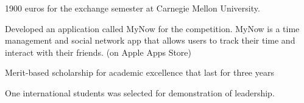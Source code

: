 \documentclass[]{deedy-resume-openfont}
\begin{document}
\begin{minipage}[t]{0.66\textwidth}
\sectionsep
{}
\begin{verytightemize}
\item 1900 euros for the exchange semester at Carnegie Mellon University.
\end{verytightemize}

\sectionsep
{}
\begin{verytightemize}
\item Developed an application called MyNow for the competition.
MyNow is a time management and social network app that allows users to 
track their time and interact with their friends. (on Apple Apps Store) 
\end{verytightemize}

\sectionsep
{}
\begin{verytightemize}
\item  Merit-based scholarship for academic excellence that last for three years
\end{verytightemize}


\sectionsep
{}
\begin{verytightemize}
\item  One international students was selected
for demonstration of leadership. 
\end{verytightemize}

\end{minipage} 
\end{document}

